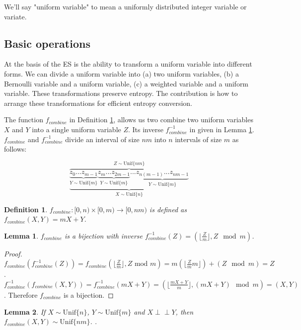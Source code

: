 \documentclass[12pt]{article}
\newtheorem{lemma}{Lemma}
\newtheorem{definition}{Definition}
\newcommand{\indep}{\perp\!\!\!\perp}
\newcommand{\unif}[1]{\mathrm{Unif}\{#1\}}
\begin{document}
We'll say "uniform variable" to mean a uniformly distributed integer variable or variate.


\subsection{Basic operations}

At the basis of the ES is the ability to transform a uniform variable into different forms.  We can divide a uniform variable into (a) two uniform variables, (b) a Bernoulli variable and a uniform variable, (c) a weighted variable and a uniform variable. These transformations preserve entropy. The contribution is how to arrange these transformations for efficient entropy conversion.

The function $f_{combine}$ in Definition \ref{def:combine}, allows us two combine two uniform variables $X$ and $Y$ into a single uniform variable $Z$. Its inverse $f^{-1}_{combine}$ in given in Lemma \ref{lem:divide}. $f_{combine}$ and $f^{-1}_{combine}$ divide an interval of size $nm$ into $n$ intervals of size $m$ as follows:

\[
\overbrace{    
    \underbrace{
        \underbrace{z_0 ... z_{m-1}}_{Y \sim \unif{m}}
        \underbrace{z_m ... z_{2m-1}}_{Y \sim \unif{m}}
        ...
        \underbrace{z_{n(m-1)}...z_{nm-1}}_{Y \sim \unif{m}}    
    }}_{X \sim \unif{n}}
^{Z \sim \unif{nm}}
\]

\begin{definition}
    $f_{combine}: [0,n)\times [0,m) \rightarrow [0,nm)$ is defined as $f_{combine}(X,Y) = mX+Y$.
    \label{def:combine}
\end{definition}

\begin{lemma}
    $f_{combine}$ is a bijection with inverse $f^{-1}_{combine}(Z) = (\lfloor \frac{Z}{m} \rfloor, Z \mod m)$.
    \label{lem:divide}
\end{lemma}

\begin{proof}
    $f_{combine}(f^{-1}_{combine}(Z)) = f_{combine}(\lfloor \frac{Z}{m}\rfloor, Z \text{ mod } m) = m(\lfloor \frac{Z}{m}m \rfloor) + (Z \mod m) = Z$. $f^{-1}_{combine}(f_{combine}(X,Y)) = f^{-1}_{combine}(mX+Y) = (\lfloor\frac{mX+Y}{m}\rfloor, (mX+Y)\mod m) = (X,Y)$. Therefore $f_{combine}$ is a bijection.
\end{proof}

\begin{lemma}
    If $X \sim \unif{n}$, $Y \sim \unif{m}$ and $X \indep Y$, then 
    $f_{combine}(X,Y) \sim \unif{nm}$.
    \label{lem:combine}.
\end{lemma}
\end{document}
